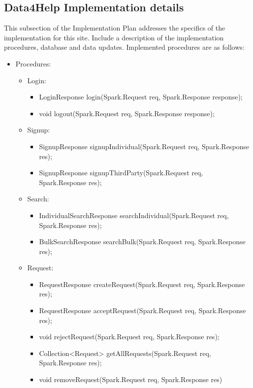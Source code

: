 \documentclass[a4paper, hidelinks, 12pt]{report}
\begin{document}
\subsection{Data4Help Implementation details}
This subsection of the Implementation Plan addresses the specifics of the implementation for this site. Include a description of the implementation procedures, database and data updates. Implemented procedures are as follows:
\begin{itemize}
\item{} Procedures:
\begin{itemize}
\item{} Login:  
\begin{itemize}
\item{} LoginResponse login(Spark.Request req, Spark.Response response);
\item{} void logout(Spark.Request req, Spark.Response response);

\end{itemize}

\item{} Signup:
\begin{itemize}
\item{} SignupResponse signupIndividual(Spark.Request req, Spark.Response res); 
\item{} SignupResponse signupThirdParty(Spark.Request req, Spark.Response res);
\end{itemize}
 
 \item{} Search:
\begin{itemize}
\item{} IndividualSearchResponse searchIndividual(Spark.Request req, Spark.Response res);
\item{} BulkSearchResponse searchBulk(Spark.Request req, Spark.Response res);
\end{itemize}

 \item{} Request:
\begin{itemize}
\item{} RequestResponse createRequest(Spark.Request req, Spark.Response res);
\item{} RequestResponse acceptRequest(Spark.Request req, Spark.Response res);
\item{} void rejectRequest(Spark.Request req, Spark.Response res);
\item{} Collection<Request> getAllRequests(Spark.Request req,
Spark.Response res);
\item{} void removeRequest(Spark.Request req, Spark.Response res)
\end{itemize}


\end{itemize}
\end{itemize}
\end{document}
